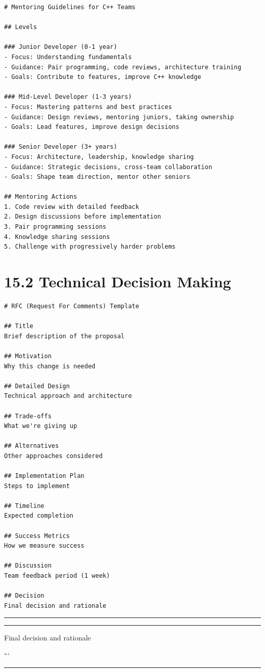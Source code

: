 \begin{lstlisting}
# Mentoring Guidelines for C++ Teams

## Levels

### Junior Developer (0-1 year)
- Focus: Understanding fundamentals
- Guidance: Pair programming, code reviews, architecture training
- Goals: Contribute to features, improve C++ knowledge

### Mid-Level Developer (1-3 years)
- Focus: Mastering patterns and best practices
- Guidance: Design reviews, mentoring juniors, taking ownership
- Goals: Lead features, improve design decisions

### Senior Developer (3+ years)
- Focus: Architecture, leadership, knowledge sharing
- Guidance: Strategic decisions, cross-team collaboration
- Goals: Shape team direction, mentor other seniors

## Mentoring Actions
1. Code review with detailed feedback
2. Design discussions before implementation
3. Pair programming sessions
4. Knowledge sharing sessions
5. Challenge with progressively harder problems
\end{lstlisting}

\hypertarget{technical-decision-making}{%
\section{15.2 Technical Decision
Making}\label{technical-decision-making}}

\begin{lstlisting}
# RFC (Request For Comments) Template

## Title
Brief description of the proposal

## Motivation
Why this change is needed

## Detailed Design
Technical approach and architecture

## Trade-offs
What we're giving up

## Alternatives
Other approaches considered

## Implementation Plan
Steps to implement

## Timeline
Expected completion

## Success Metrics
How we measure success

## Discussion
Team feedback period (1 week)

## Decision
Final decision and rationale
\end{lstlisting}

\begin{center}\rule{0.5\linewidth}{0.5pt}\end{center}

\begin{center}\rule{0.5\linewidth}{0.5pt}\end{center}

Final decision and rationale

```

\begin{center}\rule{0.5\linewidth}{0.5pt}\end{center}
